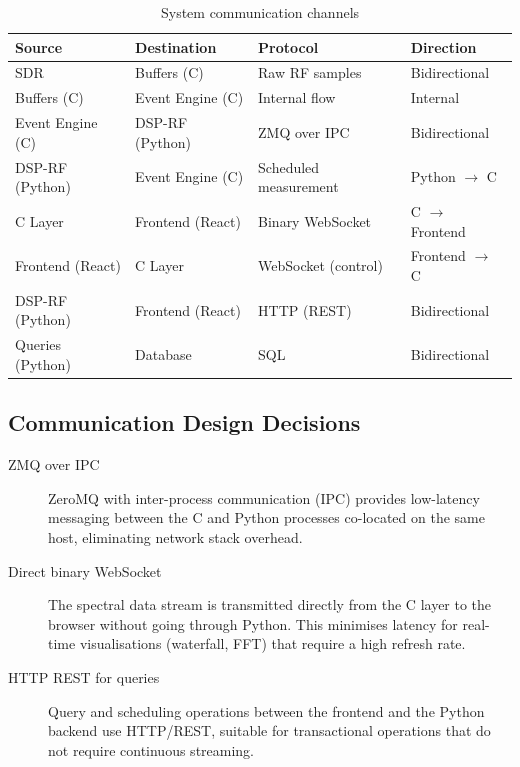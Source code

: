 \documentclass[12pt,a4paper]{article}
\begin{document}
\begin{table}[H]
\centering
\caption{System communication channels}
\label{tab:channels}
\begin{tabular}{@{}llll@{}}
\toprule
\textbf{Source} & \textbf{Destination} & \textbf{Protocol} & \textbf{Direction} \\
\midrule
SDR & Buffers (C) & Raw RF samples & Bidirectional \\
Buffers (C) & Event Engine (C) & Internal flow & Internal \\
Event Engine (C) & DSP-RF (Python) & ZMQ over IPC & Bidirectional \\
DSP-RF (Python) & Event Engine (C) & Scheduled measurement & Python $\to$ C \\
C Layer & Frontend (React) & Binary WebSocket & C $\to$ Frontend \\
Frontend (React) & C Layer & WebSocket (control) & Frontend $\to$ C \\
DSP-RF (Python) & Frontend (React) & HTTP (REST) & Bidirectional \\
Queries (Python) & Database & SQL & Bidirectional \\
\bottomrule
\end{tabular}
\end{table}

\subsection{Communication Design Decisions}

\begin{description}
  \item[ZMQ over IPC] ZeroMQ with inter-process communication (IPC) provides low-latency messaging between the C and Python processes co-located on the same host, eliminating network stack overhead.
  \item[Direct binary WebSocket] The spectral data stream is transmitted directly from the C layer to the browser without going through Python. This minimises latency for real-time visualisations (waterfall, FFT) that require a high refresh rate.
  \item[HTTP REST for queries] Query and scheduling operations between the frontend and the Python backend use HTTP/REST, suitable for transactional operations that do not require continuous streaming.
\end{description}

\end{document}
